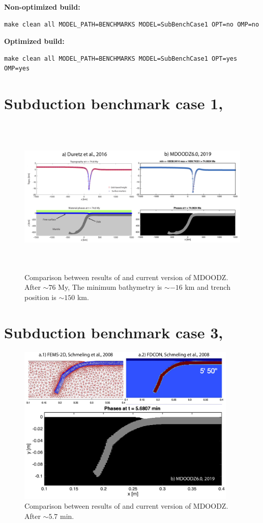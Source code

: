 \documentclass[12pt,english,openany]{scrbook}
\begin{document}
\textbf{Non-optimized build:}  
\begin{verbatim} 
make clean all MODEL_PATH=BENCHMARKS MODEL=SubBenchCase1 OPT=no OMP=no
\end{verbatim}
\textbf{Optimized build:}  
\begin{verbatim} 
make clean all MODEL_PATH=BENCHMARKS MODEL=SubBenchCase1 OPT=yes OMP=yes
\end{verbatim}
\section{Subduction benchmark case 1, \citet{Schmeling08}}

\begin{figure}[ht!]
\centerline{\includegraphics[height=3.0in]{./Figures/SubBench1_MDOODZ}}
\caption{Comparison between results of \citet{Duretz16} and current version of MDOODZ. After $\sim76$ My, The minimum bathymetry is $\sim-16$ km and trench position is $\sim150$ km.}
\label{SubBench1}
\end{figure}

\section{Subduction benchmark case 3, \citet{Schmeling08}}

\begin{figure}[ht!]
\centerline{\includegraphics[height=3.0in]{./Figures/SubBench3_MDOODZ}}
\caption{Comparison between results of \citet{Schmeling08} and current version of MDOODZ. After $\sim5.7$ min.}
\label{SubBench3}
\end{figure}
\end{document}
